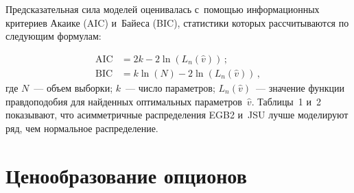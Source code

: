 \begin{multicols}{2}
  
\begin{figure*}[b] %
\vspace*{1pt}
 \begin{center}  
 \mbox{%
 \epsfxsize=161.099mm 
 }
\end{center}
\vspace*{-11pt}
\vspace*{5pt}
    \begin{center}  
  \mbox{%
 \epsfxsize=162.999mm 
 }
\end{center}
\vspace*{-11pt}
\end{figure*}

  Предсказательная сила моделей оценивалась с~помощью информационных 
критериев Акаике (AIC) и~Байеса (BIC), статистики которых рассчитываются 
по следующим формулам:

\noindent
  \begin{align*}
    \mathrm{AIC} &= 2k-2\ln\left( L_n\!\left( \hat{v}\right)\right)\,;\\[6pt]
  \mathrm{BIC} &= k\ln(N) -2\ln\left( L_n\!\left( \hat{v}\right)\right)\,,
  \end{align*}
где $N$~--- объем выборки; $k$~--- число параметров; $L_n(\hat{v})$~--- 
значение функции правдоподобия для найден\-ных оптимальных 
параметров~$\hat{v}$. Таблицы~1 и~2 показывают, что асимметричные 
распределения EGB2 и~JSU лучше моделируют ряд, чем нормальное 
распределение.


\section{Ценообразование опционов}


\end{multicols}
